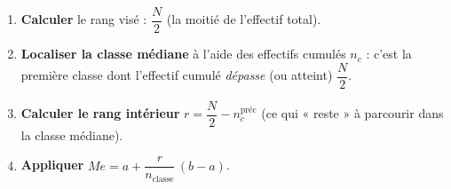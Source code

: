 \documentclass[11pt,a4paper]{article}
\newcommand{\med}{M\!e}                  %
\begin{document}
\begin{commentfaire}
\begin{enumerate}[leftmargin=1.8em,topsep=2pt,itemsep=2pt]
  \item \textbf{Calculer} le rang visé : $\dfrac{N}{2}$ (la moitié de l'effectif total).
  \item \textbf{Localiser la classe médiane} à l'aide des effectifs cumulés $n_c$ : c'est la
        première classe dont l'effectif cumulé \emph{dépasse} (ou atteint) $\dfrac{N}{2}$.
  \item \textbf{Calculer le rang intérieur} $r=\dfrac{N}{2}-n_{c}^{\text{préc}}$
        (ce qui « reste » à parcourir dans la classe médiane).
  \item \textbf{Appliquer} $\med=a+\dfrac{r}{n_{\text{classe}}}\,(b-a)$.
\end{enumerate}
\end{commentfaire}
\end{document}
